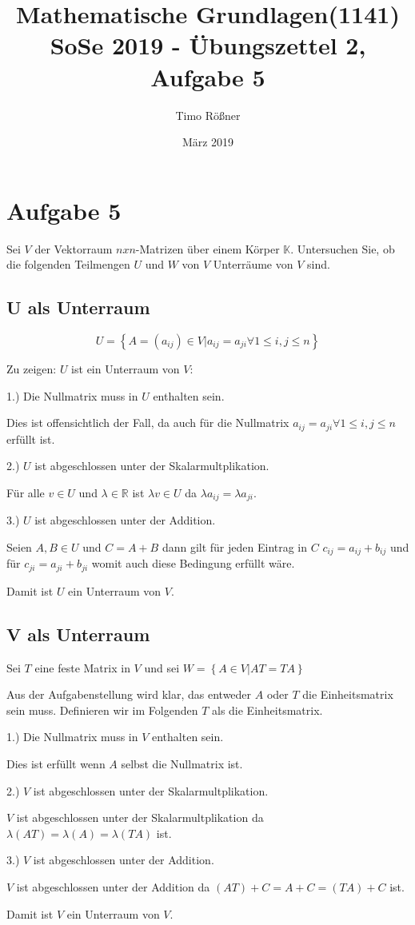 \documentclass{article}
\title{Mathematische Grundlagen(1141) SoSe 2019 - Übungszettel 2, Aufgabe 5}
\author{Timo Rößner }
\date{März 2019}
\begin{document}
\maketitle

\section*{Aufgabe 5}

Sei \(V\) der Vektorraum \(n x n\)-Matrizen über einem Körper \(\mathbb{K}\). Untersuchen Sie, ob die folgenden Teilmengen \(U\) und \(W\) von \(V\) Unterräume von \(V\) sind.


\subsection*{U als Unterraum}

\[
U =
\left \{
A = (a_{ij}) \in V | a_{ij} = a_{ji} \forall 1 \leq i,j \leq n
\right \}
\]

Zu zeigen: \(U\) ist ein Unterraum von \(V\):

1.) Die Nullmatrix muss in \(U\) enthalten sein.

Dies ist offensichtlich der Fall, da auch für die Nullmatrix \( a_{ij} = a_{ji} \forall 1 \leq i,j \leq n \) erfüllt ist.

2.) \(U\) ist abgeschlossen unter der Skalarmultplikation.

Für alle \(v \in U\) und \(\lambda \in \mathbb{R}\) ist \(\lambda v \in U\) da \(\lambda a_{ij} = \lambda a_{ji}\).

3.) \(U\) ist abgeschlossen unter der Addition.

Seien \(A, B \in U\) und \(C = A + B\) dann gilt für jeden Eintrag in \(C\) \(c_{ij} = a_{ij} + b_{ij}\) und für \(c_{ji} = a_{ji} + b_{ji}\) womit auch diese Bedingung erfüllt wäre.

Damit ist \(U\) ein Unterraum von \(V\).

\subsection*{V als Unterraum}

Sei \(T\) eine feste Matrix in \(V\) und sei
\(W =
\left \{
A \in V | AT = TA
\right \}
\)

Aus der Aufgabenstellung wird klar, das entweder \(A\) oder \(T\) die Einheitsmatrix sein muss. Definieren wir im Folgenden \(T\) als die Einheitsmatrix.

1.) Die Nullmatrix muss in \(V\) enthalten sein.

Dies ist erfüllt wenn \(A\) selbst die Nullmatrix ist.

2.) \(V\) ist abgeschlossen unter der Skalarmultplikation.

\(V\) ist abgeschlossen unter der Skalarmultplikation da \(\lambda(AT) = \lambda(A) = \lambda(TA)\) ist.

3.) \(V\) ist abgeschlossen unter der Addition.

\(V\) ist abgeschlossen unter der Addition da \((AT) + C = A + C = (TA) + C\) ist.

Damit ist \(V\) ein Unterraum von \(V\).
\end{document}
